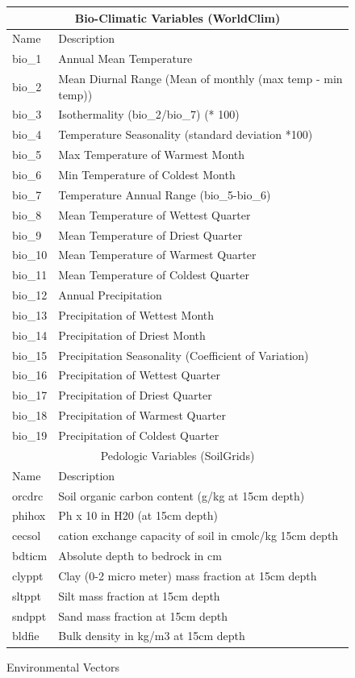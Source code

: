\documentclass[12pt, oneside]{article}
\begin{document}
\begin{normalsize}
\begin{figure}[H]
\caption{Environmental Vectors}
\centering
\begin{tabular}{ |l|l| }
\hline
\multicolumn{2}{|c|}{Bio-Climatic Variables (WorldClim) \cite{hijmans2005very}}\\
\hline
Name & Description \\
\hline
bio\_1 & Annual Mean Temperature \\
bio\_2 & Mean Diurnal Range (Mean of monthly (max temp - min temp)) \\
bio\_3 & Isothermality (bio\_2/bio\_7) (* 100) \\
bio\_4 & Temperature Seasonality (standard deviation *100) \\
bio\_5 & Max Temperature of Warmest Month \\
bio\_6 & Min Temperature of Coldest Month \\
bio\_7 & Temperature Annual Range (bio\_5-bio\_6) \\
bio\_8 & Mean Temperature of Wettest Quarter \\
bio\_9 & Mean Temperature of Driest Quarter \\
bio\_10 & Mean Temperature of Warmest Quarter \\
bio\_11 & Mean Temperature of Coldest Quarter \\
bio\_12 & Annual Precipitation \\
bio\_13 & Precipitation of Wettest Month \\
bio\_14 & Precipitation of Driest Month \\
bio\_15 & Precipitation Seasonality (Coefficient of Variation) \\
bio\_16 & Precipitation of Wettest Quarter \\
bio\_17 & Precipitation of Driest Quarter \\
bio\_18 & Precipitation of Warmest Quarter \\
bio\_19 & Precipitation of Coldest Quarter \\
\hline
\multicolumn{2}{|c|}{Pedologic Variables (SoilGrids) \cite{hengl2017soilgrids250m}} \\
\hline
Name & Description \\
\hline
orcdrc & Soil organic carbon content (g/kg at 15cm depth) \\
phihox & Ph x 10 in H20 (at 15cm depth) \\
cecsol & cation exchange capacity of soil in cmolc/kg 15cm depth \\
bdticm & Absolute depth to bedrock in cm \\
clyppt & Clay (0-2 micro meter) mass fraction at 15cm depth \\
sltppt & Silt mass fraction at 15cm depth \\
sndppt & Sand mass fraction at 15cm depth \\
bldfie & Bulk density in kg/m3 at 15cm depth \\
 \hline
\end{tabular}
\end{figure}


\end{normalsize}
\end{document}
